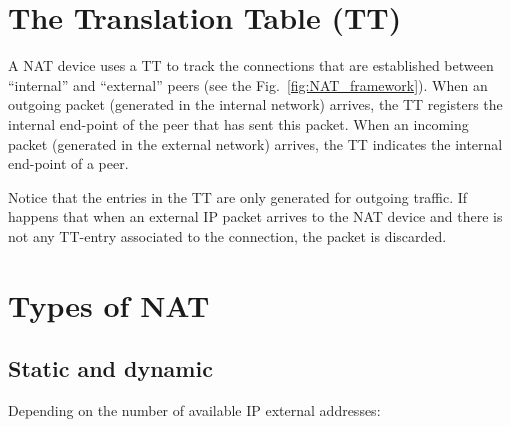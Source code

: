 \section{The Translation Table (TT)}

A NAT device uses a TT to track the connections that are established
between ``internal'' and ``external'' peers (see the
Fig.~\ref{fig:NAT_framework}). When an outgoing packet (generated in
the internal network) arrives, the TT registers the internal end-point
of the peer that has sent this packet. When an incoming packet
(generated in the external network) arrives, the TT indicates the
internal end-point of a peer.

Notice that the entries in the TT are only generated for outgoing
traffic. If happens that when an external IP packet arrives to the NAT
device and there is not any TT-entry associated to the connection, the
packet is discarded.

\section{Types of NAT}

\subsection{Static and dynamic}

Depending on the number of available IP external addresses:

